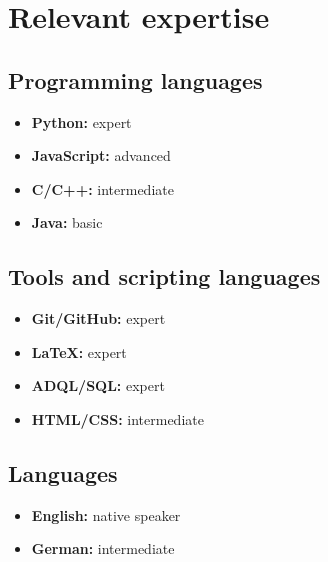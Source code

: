 \section*{Relevant expertise}

\subsection*{Programming languages}

\begin{itemize}
    \item \textbf{Python:} expert
    \item \textbf{JavaScript:} advanced
    \item \textbf{C/C++:} intermediate
    \item \textbf{Java:} basic
\end{itemize}

\subsection*{Tools and scripting languages}

\begin{itemize}
    \item \textbf{Git/GitHub:} expert
    \item \textbf{LaTeX:} expert
    \item \textbf{ADQL/SQL:} expert
    \item \textbf{HTML/CSS:} intermediate
\end{itemize}

\subsection*{Languages}

\begin{itemize}
    \item \textbf{English:} native speaker
    \item \textbf{German:} intermediate
\end{itemize}